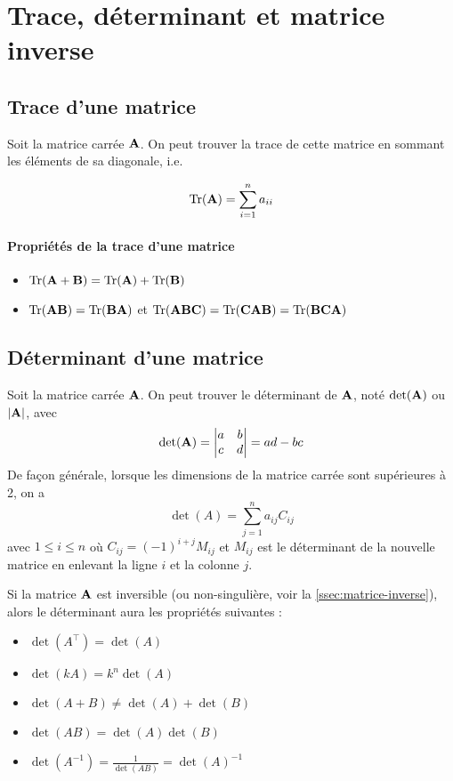 \documentclass[12pt, french]{report}
\begin{document}
\section{Trace, déterminant et matrice inverse}
\subsection{Trace d'une matrice}
\label{ssec:trace-matrice}
Soit la matrice carrée $\mathbf{A}$. On peut trouver la trace de cette matrice en sommant les éléments de sa diagonale, i.e.

\begin{equation}
\label{eq:trace-mat}
\operatorname{Tr}(\mathbf{A}) = \sum_{i=1}^n a_{ii}
\end{equation} 
\paragraph{Propriétés de la trace d'une matrice}
\begin{itemize}
\item $\operatorname{Tr}(\mathbf{A+B}) = \operatorname{Tr}(\mathbf{A}) + \operatorname{Tr}(\mathbf{B})$
\item $\operatorname{Tr}(\mathbf{AB}) = \operatorname{Tr}(\mathbf{BA})$ et $\operatorname{Tr}(\mathbf{ABC}) = \operatorname{Tr}(\mathbf{CAB}) = \operatorname{Tr}(\mathbf{BCA})$
\end{itemize}

\subsection{Déterminant d'une matrice}
\label{ssec:det-matrice}
Soit la matrice carrée $\mathbf{A}$. On peut trouver le déterminant de $\mathbf{A}$, noté $\det(\mathbf{A})$ ou $|\mathbf{A}|$, avec
\begin{equation}
\det(\mathbf{A}) =
\begin{vmatrix}
a & b \\
c & d \\
\end{vmatrix} = ad - bc
\end{equation}
De façon générale, lorsque les dimensions de la matrice carrée sont supérieures à 2, on a
\begin{equation}
\label{eq:det-matrice}
\det(A) = \sum_{j=1}^n a_{ij} C_{ij}
\end{equation}
avec $1 \le i \le n$ où $C_{ij}  = (-1)^{i+j} M_{ij}$ et $M_{ij}$ est le déterminant de la nouvelle matrice en enlevant la ligne $i$ et la colonne $j$.

Si la matrice $\mathbf{A}$ est inversible (ou non-singulière, voir la \autoref{ssec:matrice-inverse}), alors le déterminant aura les propriétés suivantes : 
\begin{itemize}
\item $\det(A^\top)  = \det(A)$
\item $\det(kA)   = k^n \det(A)$
\item $\det(A + B)  \neq \det(A) + \det(B)$
\item $\det(AB)   = \det(A) \det(B)$
\item $\det(A^{-1})  = \frac{1}{\det(AB)} = \det(A)^{-1}$
\end{itemize}
\end{document}
